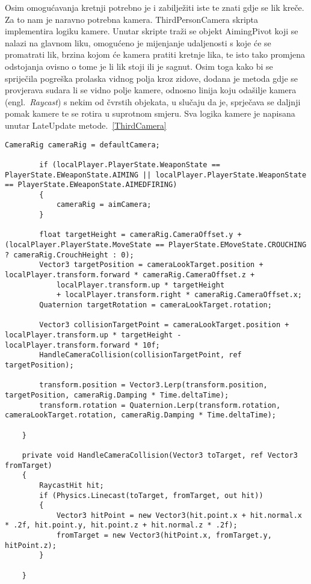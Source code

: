 Osim omogućavanja kretnji  potrebno je i zabilježiti iste te znati gdje se lik kreče. Za to nam je naravno potrebna kamera. ThirdPersonCamera skripta implementira logiku kamere. Unutar skripte traži se objekt AimingPivot koji se nalazi na glavnom liku, omogućeno je mijenjanje udaljenosti s koje će se promatrati lik, brzina kojom će kamera pratiti kretnje lika, te isto tako promjena odstojanja ovisno o tome je li lik stoji ili je sagnut. Osim toga kako bi se spriječila pogreška prolaska vidnog polja kroz zidove, dodana je metoda gdje se provjerava sudara li se vidno polje kamere, odnosno linija koju odašilje kamera (engl.~\textit{Raycast}) s nekim od čvrstih objekata, u slučaju da je, sprječava se daljnji pomak kamere te se rotira u suprotnom smjeru. Sva logika kamere je napisana unutar LateUpdate metode.~\ref{ThirdCamera}
\begin{lstlisting}[caption={Logika kamere}, label=ThirdCamera]
    CameraRig cameraRig = defaultCamera;

        if (localPlayer.PlayerState.WeaponState == PlayerState.EWeaponState.AIMING || localPlayer.PlayerState.WeaponState == PlayerState.EWeaponState.AIMEDFIRING)
        {
            cameraRig = aimCamera;
        }

        float targetHeight = cameraRig.CameraOffset.y + (localPlayer.PlayerState.MoveState == PlayerState.EMoveState.CROUCHING ? cameraRig.CrouchHeight : 0);
        Vector3 targetPosition = cameraLookTarget.position + localPlayer.transform.forward * cameraRig.CameraOffset.z +
            localPlayer.transform.up * targetHeight
            + localPlayer.transform.right * cameraRig.CameraOffset.x;
        Quaternion targetRotation = cameraLookTarget.rotation;

        Vector3 collisionTargetPoint = cameraLookTarget.position + localPlayer.transform.up * targetHeight - localPlayer.transform.forward * 10f;
        HandleCameraCollision(collisionTargetPoint, ref targetPosition);

        transform.position = Vector3.Lerp(transform.position, targetPosition, cameraRig.Damping * Time.deltaTime);
        transform.rotation = Quaternion.Lerp(transform.rotation, cameraLookTarget.rotation, cameraRig.Damping * Time.deltaTime);

    }

    private void HandleCameraCollision(Vector3 toTarget, ref Vector3 fromTarget)
    {
        RaycastHit hit;
        if (Physics.Linecast(toTarget, fromTarget, out hit))
        {
            Vector3 hitPoint = new Vector3(hit.point.x + hit.normal.x * .2f, hit.point.y, hit.point.z + hit.normal.z * .2f);
            fromTarget = new Vector3(hitPoint.x, fromTarget.y, hitPoint.z);
        }

    }
\end{lstlisting}

